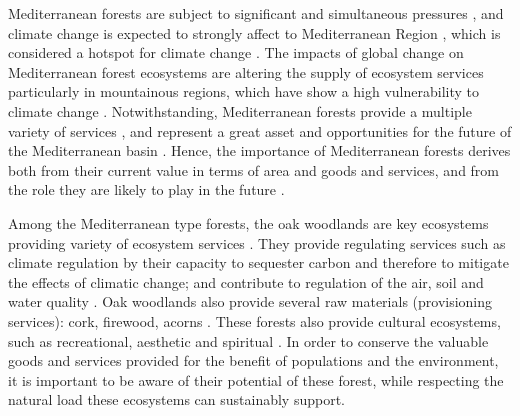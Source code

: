 Mediterranean forests are subject to significant and simultaneous pressures \autocites{FAOPlanBleu2018StateMediterranean, DoblasMirandaetal2017ReviewCombination}, and climate change is expected to strongly affect to Mediterranean Region \autocite{GiorgiLionello2008ClimateChange, Penuelasetal2017ImpactsGlobal,Crameretal2018ClimateChange,Crameretal2020ClimateEnvironmental}, which is considered a hotspot for climate change \autocite{Giorgi2006ClimateChange}. The impacts of global change on Mediterranean forest ecosystems are altering the supply of ecosystem services \autocite{Lindneretal2010ClimateChange,Lindneretal2014ClimateChange,NoceSantini2018MediterraneanForest,Penuelasetal2017ImpactsGlobal,SerradaHierroetal2011ImpactosVulnerabilidad} particularly in mountainous regions, which have show a high vulnerability to climate change \autocite{Schroteretal2005EcosystemService}. Notwithstanding, Mediterranean forests provide a multiple variety of services \autocite{NoceSantini2018MediterraneanForest}, and represent a great asset and opportunities for the future of the Mediterranean basin \autocite{Gauquelinetal2018MediterraneanForests, NoceSantini2018MediterraneanForest}. Hence, the importance of Mediterranean forests derives both from their current value in terms of area and goods and services, and from the role they are likely to play in the future \autocites{FAOPlanBleu2018StateMediterranean}.

Among the Mediterranean type forests, the oak woodlands are key ecosystems providing variety of ecosystem services \autocite{Maranonetal2020IberianOaks}. They provide regulating services such as climate regulation by their capacity to sequester carbon and therefore to mitigate the effects of climatic change; and contribute to regulation of the air, soil and water quality \autocite{Maranonetal2012EstadoTendencia}. Oak woodlands also provide several raw materials (provisioning services): cork, firewood, acorns \autocite{Bugalhoetal2011MediterraneanCork}. These forests also provide cultural ecosystems, such as recreational, aesthetic and spiritual \autocite{Lofetal2016ManagementOak}. In order to conserve the valuable goods and services provided for the benefit of populations and the environment, it is important to be aware of their potential of these forest, while respecting the natural load these ecosystems can sustainably support. 

